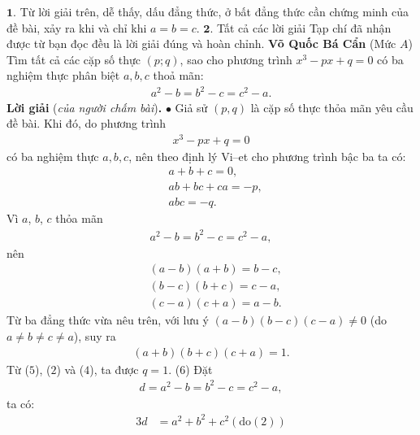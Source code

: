\begin{multicols}{2}
	\vskip 0.05cm
	$\pmb{1.}$ Từ lời giải trên, dễ thấy, dấu đẳng thức, ở bất đẳng thức cần chứng minh của đề bài, xảy ra khi và chỉ khi $a = b = c$.
	\vskip 0.05cm
	$\pmb{2.}$ Tất cả các lời giải Tạp chí đã nhận được từ bạn đọc đều là lời giải đúng và hoàn chỉnh.
	\vskip 0.1cm
		\hfill\textbf{\color{thachthuctoanhoc}Võ Quốc Bá Cẩn}
	\vskip 0.1cm
	{}
	(Mức $A$) Tìm tất cả các cặp số thực $(p;q)$, sao cho phương trình $x^3-px+q=0$ có ba nghiệm thực phân biệt $a,b,c$  thoả mãn:
	\begin{align*}
		a^2-b=b^2-c=c^2-a.
	\end{align*}
	\textbf{\color{thachthuctoanhoc}Lời giải} (\textit{của người chấm bài})\textbf{\color{thachthuctoanhoc}.}
	\vskip 0.05cm
	$\bullet$ Giả sử $(p, q)$ là cặp số thực thỏa mãn yêu cầu đề bài.
	\vskip 0.05cm
	Khi đó, do phương trình
	\begin{align*}
		{x^3} - px + q = 0 \tag{$1$}
	\end{align*}
	có ba nghiệm thực $a, b, c$, nên theo định lý Vi--et cho phương trình bậc ba ta có:
	\begin{align*}
		&a + b + c = 0, \tag{$2$}\\[-0.5ex]
		&ab + bc + ca = -p,  \tag{$3$}\\[-0.5ex]
		&abc = -q. \tag{$4$}  
	\end{align*}
	Vì $a$, $b$, $c$ thỏa mãn
	\begin{align*}
		{a^2} - b = {b^2} - c = {c^2} - a,
	\end{align*}
	nên
	\begin{align*}
		&\left( {a - b} \right)\left( {a + b} \right) = b - c,\\[-0.5ex]
		&\left( {b - c} \right)\left( {b + c} \right) = c - a,\\[-0.5ex]
		&\left( {c - a} \right)\left( {c + a} \right) = a - b.
	\end{align*}
	Từ ba đẳng thức vừa nêu trên, với lưu ý $(a - b)(b - c)(c - a) \ne 0$ (do $a \ne b \ne c \ne a$), suy ra
	\begin{align*}
		(a + b)(b + c)(c + a) = 1.
	\end{align*}
	Từ ($5$), ($2$) và ($4$), ta được $q = 1$. \hfill ($6$)
	\vskip 0.05cm
	Đặt
	\begin{align*}
		d = {a^2} - b = {b^2} - c = {c^2} - a, \tag{$7$}
	\end{align*}
	ta có:
	\begin{align*}
		3d &= {a^2} + {b^2} + {c^2}({\text{do}}(2))\\[-0.5ex]

\end{align*}
\end{multicols}
